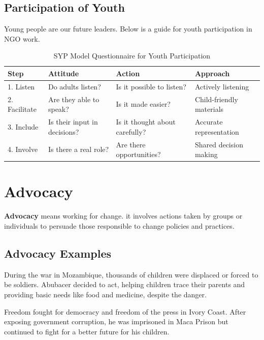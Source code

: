 \documentclass[12pt,a4paper]{article}
\begin{document}
\subsection*{Participation of Youth}
Young people are our future leaders. Below is a guide for youth participation in NGO work.

\begin{table}[h!]
    \centering
    \caption{SYP Model Questionnaire for Youth Participation}
    \begin{tabular}{|l|p{3.5cm}|p{3.5cm}|p{3.5cm}|}
        \hline
        \textbf{Step} & \textbf{Attitude} & \textbf{Action} & \textbf{Approach} \\ \hline
        1. Listen & Do adults listen? & Is it possible to listen? & Actively listening \\ \hline
        2. Facilitate & Are they able to speak? & Is it made easier? & Child-friendly materials \\ \hline
        3. Include & Is their input in decisions? & Is it thought about carefully? & Accurate representation \\ \hline
        4. Involve & Is there a real role? & Are there opportunities? & Shared decision making \\ \hline
    \end{tabular}
\end{table}

\section*{Advocacy}
\textbf{Advocacy} means working for change. it involves actions taken by groups or individuals to persuade those responsible to change policies and practices.

\subsection*{Advocacy Examples}

\begin{tcolorbox}[title=Abubacer’s Story (Mozambique)]
During the war in Mozambique, thousands of children were displaced or forced to be soldiers. Abubacer decided to act, helping children trace their parents and providing basic needs like food and medicine, despite the danger.
\end{tcolorbox}

\begin{tcolorbox}[title=Freedom’s Story (Ivory Coast)]
Freedom fought for democracy and freedom of the press in Ivory Coast. After exposing government corruption, he was imprisoned in Maca Prison but continued to fight for a better future for his children.
\end{tcolorbox}
\end{document}
